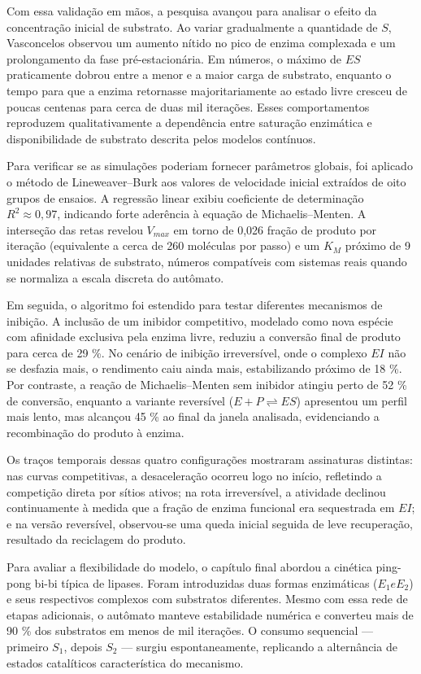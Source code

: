 \documentclass[12pt,oneside]{report}
\begin{document}
Com essa validação em mãos, a pesquisa avançou para analisar o efeito da concentração inicial de substrato. Ao variar gradualmente a quantidade de $S$, Vasconcelos observou um aumento nítido no pico de enzima complexada e um prolongamento da fase pré-estacionária. Em números, o máximo de $ES$ praticamente dobrou entre a menor e a maior carga de substrato, enquanto o tempo para que a enzima retornasse majoritariamente ao estado livre cresceu de poucas centenas para cerca de duas mil iterações. Esses comportamentos reproduzem qualitativamente a dependência entre saturação enzimática e disponibilidade de substrato descrita pelos modelos contínuos.

Para verificar se as simulações poderiam fornecer parâmetros globais, foi aplicado o método de Lineweaver–Burk aos valores de velocidade inicial extraídos de oito grupos de ensaios. A regressão linear exibiu coeficiente de determinação $R^2 \approx 0,97$, indicando forte aderência à equação de Michaelis–Menten. A interseção das retas revelou $V_{max}$ em torno de 0,026 fração de produto por iteração (equivalente a cerca de 260 moléculas por passo) e um $K_M$ próximo de 9 unidades relativas de substrato, números compatíveis com sistemas reais quando se normaliza a escala discreta do autômato.

Em seguida, o algoritmo foi estendido para testar diferentes mecanismos de inibição. A inclusão de um inibidor competitivo, modelado como nova espécie com afinidade exclusiva pela enzima livre, reduziu a conversão final de produto para cerca de 29 \%. No cenário de inibição irreversível, onde o complexo $EI$ não se desfazia mais, o rendimento caiu ainda mais, estabilizando próximo de 18 \%. Por contraste, a reação de Michaelis–Menten sem inibidor atingiu perto de 52 \% de conversão, enquanto a variante reversível ($E + P \rightleftharpoons ES$) apresentou um perfil mais lento, mas alcançou 45 \% ao final da janela analisada, evidenciando a recombinação do produto à enzima.

Os traços temporais dessas quatro configurações mostraram assinaturas distintas: nas curvas competitivas, a desaceleração ocorreu logo no início, refletindo a competição direta por sítios ativos; na rota irreversível, a atividade declinou continuamente à medida que a fração de enzima funcional era sequestrada em $EI$; e na versão reversível, observou-se uma queda inicial seguida de leve recuperação, resultado da reciclagem do produto.

Para avaliar a flexibilidade do modelo, o capítulo final abordou a cinética ping-pong bi-bi típica de lipases. Foram introduzidas duas formas enzimáticas ($E_1 e E_2$) e seus respectivos complexos com substratos diferentes. Mesmo com essa rede de etapas adicionais, o autômato manteve estabilidade numérica e converteu mais de 90 \% dos substratos em menos de mil iterações. O consumo sequencial — primeiro $S_1$, depois $S_2$ — surgiu espontaneamente, replicando a alternância de estados catalíticos característica do mecanismo.
\end{document}
